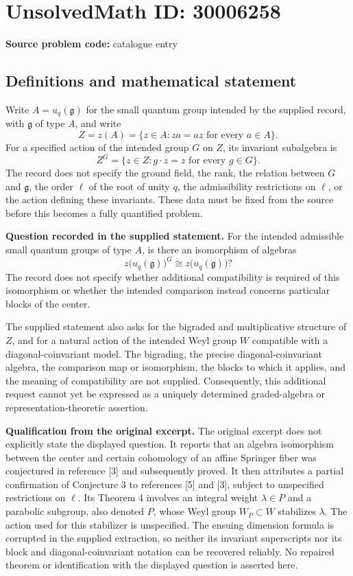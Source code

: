 \documentclass[11pt]{article}
\begin{document}
\section*{UnsolvedMath ID: 30006258}
\textbf{Source problem code:} catalogue entry
\subsection{Definitions and mathematical statement}
Write \(A=u_q(\mathfrak g)\) for the small quantum group intended by the supplied record, with \(\mathfrak g\) of type \(A\), and write
\[
Z=z(A)=\{z\in A:za=az\text{ for every }a\in A\}.
\]
For a specified action of the intended group \(G\) on \(Z\), its invariant subalgebra is
\[
Z^G=\{z\in Z:g\cdot z=z\text{ for every }g\in G\}.
\]
The record does not specify the ground field, the rank, the relation between \(G\) and \(\mathfrak g\), the order \(\ell\) of the root of unity \(q\), the admissibility restrictions on \(\ell\), or the action defining these invariants. These data must be fixed from the source before this becomes a fully quantified problem.

\textbf{Question recorded in the supplied statement.} For the intended admissible small quantum groups of type \(A\), is there an isomorphism of algebras
\[
z\bigl(u_q(\mathfrak g)\bigr)^G\cong z\bigl(u_q(\mathfrak g)\bigr)?
\]
The record does not specify whether additional compatibility is required of this isomorphism or whether the intended comparison instead concerns particular blocks of the center.

The supplied statement also asks for the bigraded and multiplicative structure of \(Z\), and for a natural action of the intended Weyl group \(W\) compatible with a diagonal-coinvariant model. The bigrading, the precise diagonal-coinvariant algebra, the comparison map or isomorphism, the blocks to which it applies, and the meaning of compatibility are not supplied. Consequently, this additional request cannot yet be expressed as a uniquely determined graded-algebra or representation-theoretic assertion.

\textbf{Qualification from the original excerpt.} The original excerpt does not explicitly state the displayed question. It reports that an algebra isomorphism between the center and certain cohomology of an affine Springer fiber was conjectured in reference [3] and subsequently proved. It then attributes a partial confirmation of Conjecture 3 to references [5] and [3], subject to unspecified restrictions on \(\ell\). Its Theorem 4 involves an integral weight \(\lambda\in P\) and a parabolic subgroup, also denoted \(P\), whose Weyl group \(W_P\subset W\) stabilizes \(\lambda\). The action used for this stabilizer is unspecified. The ensuing dimension formula is corrupted in the supplied extraction, so neither its invariant superscripts nor its block and diagonal-coinvariant notation can be recovered reliably. No repaired theorem or identification with the displayed question is asserted here.
\end{document}
